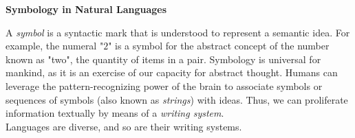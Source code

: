 
\begin{tcolorbox}[breakable, enhanced, colback=textbook-blue, sharp corners]
	\vspace{2mm}
	\begin{center}
		\textbf{Symbology in Natural Languages}
	\end{center}
	\vspace{1mm}
	
	A \textit{symbol} is a syntactic mark that is understood to represent a semantic idea. For example, the numeral "$2$" is a symbol for the abstract concept of the number known as "two", the quantity of items in a pair. Symbology is universal for mankind, as it is an exercise of our capacity for abstract thought. Humans can leverage the pattern-recognizing power of the brain to associate symbols or sequences of symbols (also known as \textit{strings}) with ideas. Thus, we can proliferate information textually by means of a \textit{writing system}. \\
	
	Languages are diverse, and so are their writing systems.
	\vspace{1mm}
\end{tcolorbox}
\vspace{7mm}


